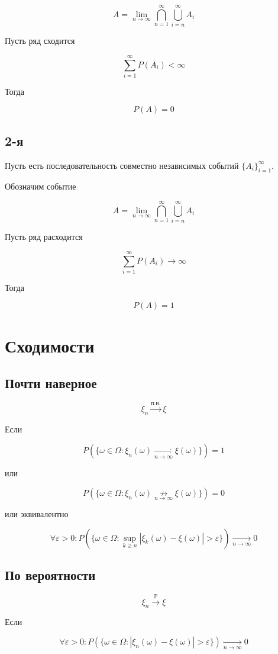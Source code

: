 \documentclass[a4paper, 14pt]{extarticle}
\begin{document}
$$A = \lim_{n\to \infty}\bigcap_{n=1}^{\infty}\bigcup_{i=n}^{\infty}A_i$$

Пусть ряд сходится

$$\sum_{i=1}^{\infty}P(A_i) < \infty$$

Тогда

$$P(A) = 0$$

\subsection{2-я}

Пусть есть последовательность совместно независимых событий $\{A_i\}_{i=1}^{\infty}$.

Обозначим событие 

$$A = \lim_{n\to \infty}\bigcap_{n=1}^{\infty}\bigcup_{i=n}^{\infty}A_i$$

Пусть ряд расходится

$$\sum_{i=1}^{\infty}P(A_i) \to \infty$$

Тогда

$$P(A) = 1$$

\section{Сходимости}
\subsection{Почти наверное}
$$\xi_n \overset{\textrm{п.н.}}{\to} \xi$$

Если

$$P(\{ \omega \in \Omega : \xi_n(\omega) \underset{n \to \infty}{\to} \xi(\omega) \}) = 1$$ 

или

$$P(\{ \omega \in \Omega : \xi_n(\omega) \underset{n \to \infty}{\not\to} \xi(\omega) \}) = 0$$ 

или эквивалентно

$$\forall \varepsilon > 0 : P(\{ \omega \in \Omega : \sup_{k \geq n} |\xi_k(\omega)-\xi(\omega)| > \varepsilon \}) \underset{n \to \infty}{\to} 0$$

\subsection{По вероятности}
$$\xi_n \overset{\mathbb{P}}{\to} \xi$$ 

Если

$$\forall \varepsilon > 0 : P(\{\omega \in \Omega : |\xi_n(\omega)-\xi(\omega)| > \varepsilon \}) \underset{n \to \infty}{\to} 0$$
\end{document}
